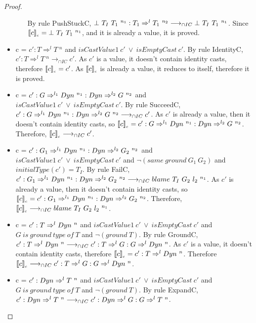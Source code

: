 \documentclass[a4paper]{article}
\begin{document}
\begin{proof}
\begin{itemize}
\begin{itemize}
        By rule PushStuckC, $\stuckcast{T_I}{T_1}{n_1} : T_1 \Rightarrow^l T_1\ ^{n_2} \longrightarrow_{\cap IC} \stuckcast{T_I}{T_1}{n_1}$.
        Since $\llbracket c \rrbracket_{_c} = \bot\ T_I\ T_1\ ^{n_1}$, and it is already a value, it is proved.
    \end{itemize}
    \item c = $c' : T \Rightarrow^l T\ ^n$ and $isCastValue1\ c'\ \lor\ isEmptyCast\ c'$.
    By rule IdentityC, $c' : T \Rightarrow^l T\ ^n \longrightarrow_{\cap IC} c'$.
    As $c'$ is a value, it doesn't contain identity casts, therefore $\llbracket c \rrbracket_{_c} = c'$.
    As $\llbracket c \rrbracket_{_c}$ is already a value, it reduces to itself, therefore it is proved.
    \item c = $c' : G \Rightarrow^{l_1} \Dyn\ ^{n_1} : \Dyn \Rightarrow^{l_2} G\ ^{n_2}$ and $isCastValue1\ c'\ \lor\ isEmptyCast\ c'$.
    By rule SucceedC, $c' : G \Rightarrow^{l_1} Dyn\ ^{n_1} : Dyn \Rightarrow^{l_2} G\ ^{n_2} \longrightarrow_{\cap IC} c'$.
    As $c'$ is already a value, then it doesn't contain identity casts, so $\llbracket c \rrbracket_{_c} = c' : G \Rightarrow^{l_1} Dyn\ ^{n_1} : Dyn \Rightarrow^{l_2} G\ ^{n_2}$.
    Therefore, $\llbracket c \rrbracket_{_c} \longrightarrow_{\cap IC} c'$.
    \item c = $c' : G_1 \Rightarrow^{l_1} \Dyn\ ^{n_1} : \Dyn \Rightarrow^{l_2} G_2\ ^{n_2}$ and $isCastValue1\ c'\ \lor\ isEmptyCast\ c'$ and $\neg(same\ ground\ G_1\ G_2)$ and $initialType(c') = T_I$.
    By rule FailC, $c' : G_1 \Rightarrow^{l_1} Dyn\ ^{n_1} : Dyn \Rightarrow^{l_2} G_2\ ^{n_2} \longrightarrow_{\cap IC} blame\ T_I\ G_2\ l_2\ ^{n_1}$.
    As $c'$ is already a value, then it doesn't contain identity casts, so $\erasec{c} = c' : G_1 \Rightarrow^{l_1} \Dyn\ ^{n_1} : \Dyn \Rightarrow^{l_2} G_2\ ^{n_2}$.
    Therefore, $\llbracket c \rrbracket_{_c} \longrightarrow_{\cap IC} blame\ T_I\ G_2\ l_2\ ^{n_1}$.
    \item c = $c' : T \Rightarrow^l \Dyn\ ^n$ and $isCastValue1\ c'\ \lor\ isEmptyCast\ c'$ and $G\ is\ ground\ type\ of\ T$ and $\neg(ground\ T)$.
    By rule GroundC, $c' : T \Rightarrow^l \Dyn\ ^n \longrightarrow_{\cap IC} c' : T \Rightarrow^l G : G \Rightarrow^l \Dyn\ ^n$.
    As $c'$ is a value, it doesn't contain identity casts, therefore $\llbracket c \rrbracket_{_c} = c' : T \Rightarrow^l Dyn\ ^n$.
    Therefore $\llbracket c \rrbracket_{_c} \longrightarrow_{\cap IC} c' : T \Rightarrow^l G : G \Rightarrow^l Dyn\ ^n$.
    \item c = $c' : \Dyn \Rightarrow^l T\ ^n$ and $isCastValue1\ c'\ \lor\ isEmptyCast\ c'$ and $G\ is\ ground\ type\ of\ T$ and $\neg(ground\ T)$.
    By rule ExpandC, $c' : \Dyn \Rightarrow^l T\ ^n \longrightarrow_{\cap IC} c' : \Dyn \Rightarrow^l G : G \Rightarrow^l T\ ^n$.

\end{itemize}
\end{proof}
\end{document}
